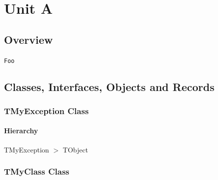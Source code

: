 \documentclass{report}
\newif\ifpdf
\begin{document}
\label{toc}\tableofcontents
\newpage
\newlength{\tmplength}
\chapter{Unit A}
\label{A}
\section{Overview}
\begin{description}
\item[\texttt{\begin{ttfamily}TMyException\end{ttfamily} Class}]
\item[\texttt{\begin{ttfamily}TMyClass\end{ttfamily} Class}]
\end{description}
\begin{description}
\item[\texttt{Foo}] 
\end{description}
\section{Classes, Interfaces, Objects and Records}
\ifpdf
\subsection*{\large{\textbf{TMyException Class}}\normalsize\hspace{1ex}\hrulefill}
\else
\subsection*{TMyException Class}
\fi
\label{A.TMyException}
\subsubsection*{\large{\textbf{Hierarchy}}\normalsize\hspace{1ex}\hfill}
TMyException {$>$} TObject
\ifpdf
\subsection*{\large{\textbf{TMyClass Class}}\normalsize\hspace{1ex}\hrulefill}
\else
\subsection*{TMyClass Class}
\fi
\label{A.TMyClass}
\end{document}
